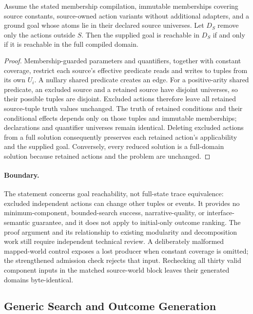 \begin{proposition}
Assume the stated membership compilation, immutable memberships covering source constants, source-owned action variants without additional adapters, and a ground goal whose atoms lie in their declared source universes. Let $D_S$ remove only the actions outside $S$. Then the supplied goal is reachable in $D_S$ if and only if it is reachable in the full compiled domain.
\end{proposition}
\begin{proof}
Membership-guarded parameters and quantifiers, together with constant coverage, restrict each source's effective predicate reads and writes to tuples from its own $U_i$. A nullary shared predicate creates an edge. For a positive-arity shared predicate, an excluded source and a retained source have disjoint universes, so their possible tuples are disjoint. Excluded actions therefore leave all retained source-tuple truth values unchanged. The truth of retained conditions and their conditional effects depends only on those tuples and immutable memberships; declarations and quantifier universes remain identical. Deleting excluded actions from a full solution consequently preserves each retained action's applicability and the supplied goal. Conversely, every reduced solution is a full-domain solution because retained actions and the problem are unchanged.
\end{proof}

\paragraph{Boundary.}
The statement concerns goal reachability, not full-state trace equivalence: excluded independent actions can change other tuples or events. It provides no minimum-component, bounded-search success, narrative-quality, or interface-semantic guarantee, and it does not apply to initial-only outcome ranking. The proof argument and its relationship to existing modularity and decomposition work still require independent technical review. A deliberately malformed mapped-world control exposes a lost producer when constant coverage is omitted; the strengthened admission check rejects that input. Rechecking all thirty valid component inputs in the matched source-world block leaves their generated domains byte-identical.

\subsection{Generic Search and Outcome Generation}

